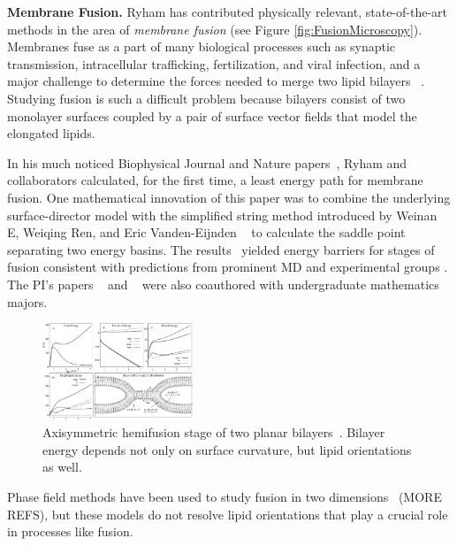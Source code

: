 \noindent\textbf{Membrane Fusion.} Ryham has contributed
physically relevant, state-of-the-art methods in the
area of \emph{membrane fusion} (see Figure \ref{fig:FusionMicroscopy}).
Membranes fuse as a part of many biological
processes such as synaptic transmission, intracellular trafficking,
fertilization, and viral infection, and  a major challenge
to determine the forces needed to merge two lipid bilayers
~\cite{chernomordik2008mechanics, kozlov1982possible, Kuzmin19062001, markin2002membrane, qian2012novel}.  
Studying fusion is such a difficult problem because bilayers
consist of two monolayer surfaces coupled by a pair of surface vector fields
that model the elongated lipids. 


In his much noticed Biophysical Journal
and Nature papers~\cite{RyKlYaCo16,Chetal16}, Ryham and collaborators 
calculated, for the first time, a least energy path for membrane fusion.  
One mathematical innovation of this paper was to combine
the underlying surface-director model  with the simplified string method 
introduced by Weinan E, Weiqing Ren, and Eric Vanden-Eijnden
~\cite{doi:10.1063/1.2720838}
to calculate the saddle point separating two energy basins. 
The results~\cite{RyKlYaCo16} yielded energy barriers for stages of fusion
consistent with predictions from prominent MD and experimental groups
\cite{SmRiMu19,2017PNAS..114.1238F}.
The PI's papers ~\cite{RyWaCo13} and ~\cite{RyKlYaCo16} 
were also coauthored with undergraduate
mathematics majors.

\begin{figure}
  \vspace{-5pt}
\centerline{\includegraphics[width=0.4\textwidth]{figures/SA1Figures/Hemifusion.pdf}}
  \vspace{-5pt}
\caption{\label{fig:Hemifusion}
Axisymmetric hemifusion stage of two planar bilayers~\cite{RyKlYaCo16}.
Bilayer energy depends not only on surface curvature, but lipid orientations as well.}
\end{figure}
Phase field methods have been used to
study fusion in two dimensions~\cite{C9SM01983A} (MORE REFS), 
but these models do not resolve lipid orientations that play a crucial
role in processes like fusion.

